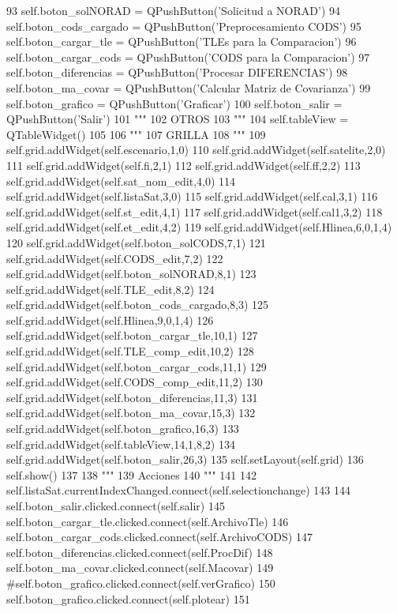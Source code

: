 \begin{DoxyCode}
93         self.boton_solNORAD     = QPushButton('Solicitud a NORAD')
94         self.boton_cods_cargado = QPushButton('Preprocesamiento CODS')
95         self.boton_cargar_tle   = QPushButton('TLEs para la Comparacion')
96         self.boton_cargar_cods  = QPushButton('CODS para la Comparacion')
97         self.boton_diferencias  = QPushButton('Procesar DIFERENCIAS')
98         self.boton_ma_covar     = QPushButton('Calcular Matriz de Covarianza')
99         self.boton_grafico      = QPushButton('Graficar')
100         self.boton_salir        = QPushButton('Salir')
101         """
102         OTROS
103         """
104         self.tableView       = QTableWidget()
105 
106         """
107         GRILLA
108         """
109         self.grid.addWidget(self.escenario,1,0)
110         self.grid.addWidget(self.satelite,2,0)
111         self.grid.addWidget(self.fi,2,1)
112         self.grid.addWidget(self.ff,2,2)
113         self.grid.addWidget(self.sat_nom_edit,4,0)
114         self.grid.addWidget(self.listaSat,3,0)
115         self.grid.addWidget(self.cal,3,1)
116         self.grid.addWidget(self.st_edit,4,1)
117         self.grid.addWidget(self.cal1,3,2)
118         self.grid.addWidget(self.et_edit,4,2)       
119         self.grid.addWidget(self.Hlinea,6,0,1,4)
120         self.grid.addWidget(self.boton_solCODS,7,1)
121         self.grid.addWidget(self.CODS_edit,7,2)
122         self.grid.addWidget(self.boton_solNORAD,8,1)  
123         self.grid.addWidget(self.TLE_edit,8,2)
124         self.grid.addWidget(self.boton_cods_cargado,8,3)
125         self.grid.addWidget(self.Hlinea,9,0,1,4)           
126         self.grid.addWidget(self.boton_cargar_tle,10,1)
127         self.grid.addWidget(self.TLE_comp_edit,10,2)        
128         self.grid.addWidget(self.boton_cargar_cods,11,1)
129         self.grid.addWidget(self.CODS_comp_edit,11,2)
130         self.grid.addWidget(self.boton_diferencias,11,3)
131         self.grid.addWidget(self.boton_ma_covar,15,3)
132         self.grid.addWidget(self.boton_grafico,16,3)
133         self.grid.addWidget(self.tableView,14,1,8,2)
134         self.grid.addWidget(self.boton_salir,26,3)
135         self.setLayout(self.grid)
136         self.show()
137         
138         """
139         Acciones
140         """
141 
142         self.listaSat.currentIndexChanged.connect(self.selectionchange)
143         
144         self.boton_salir.clicked.connect(self.salir)
145         self.boton_cargar_tle.clicked.connect(self.ArchivoTle)
146         self.boton_cargar_cods.clicked.connect(self.ArchivoCODS)
147         self.boton_diferencias.clicked.connect(self.ProcDif)
148         self.boton_ma_covar.clicked.connect(self.Macovar)
149         #self.boton_grafico.clicked.connect(self.verGrafico)
150         self.boton_grafico.clicked.connect(self.plotear)
151         
    
\end{DoxyCode}


